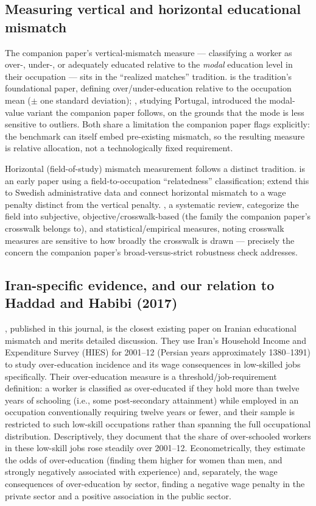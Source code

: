 \documentclass[11pt]{article}
\begin{document}
\subsection{Measuring vertical and horizontal educational mismatch}

The companion paper's vertical-mismatch measure --- classifying a worker as over-, under-, or adequately educated relative to the \emph{modal} education level in their occupation --- sits in the ``realized matches'' tradition. \citet{verdugo1989} is the tradition's foundational paper, defining over/under-education relative to the occupation mean ($\pm$ one standard deviation); \citet{kiker1997}, studying Portugal, introduced the modal-value variant the companion paper follows, on the grounds that the mode is less sensitive to outliers. Both share a limitation the companion paper flags explicitly: the benchmark can itself embed pre-existing mismatch, so the resulting measure is relative allocation, not a technologically fixed requirement.

Horizontal (field-of-study) mismatch measurement follows a distinct tradition. \citet{robst2007} is an early paper using a field-to-occupation ``relatedness'' classification; \citet{nordin2010} extend this to Swedish administrative data and connect horizontal mismatch to a wage penalty distinct from the vertical penalty. \citet{somers2019}, a systematic review, categorize the field into subjective, objective/crosswalk-based (the family the companion paper's crosswalk belongs to), and statistical/empirical measures, noting crosswalk measures are sensitive to how broadly the crosswalk is drawn --- precisely the concern the companion paper's broad-versus-strict robustness check addresses.

\subsection{Iran-specific evidence, and our relation to Haddad and Habibi (2017)}
\label{sec:haddad}

\citet{haddad2017}, published in this journal, is the closest existing paper on Iranian educational mismatch and merits detailed discussion. They use Iran's Household Income and Expenditure Survey (HIES) for 2001--12 (Persian years approximately 1380--1391) to study over-education incidence and its wage consequences in low-skilled jobs specifically. Their over-education measure is a threshold/job-requirement definition: a worker is classified as over-educated if they hold more than twelve years of schooling (i.e., some post-secondary attainment) while employed in an occupation conventionally requiring twelve years or fewer, and their sample is restricted to such low-skill occupations rather than spanning the full occupational distribution. Descriptively, they document that the share of over-schooled workers in these low-skill jobs rose steadily over 2001--12. Econometrically, they estimate the odds of over-education (finding them higher for women than men, and strongly negatively associated with experience) and, separately, the wage consequences of over-education by sector, finding a negative wage penalty in the private sector and a positive association in the public sector.
\end{document}
